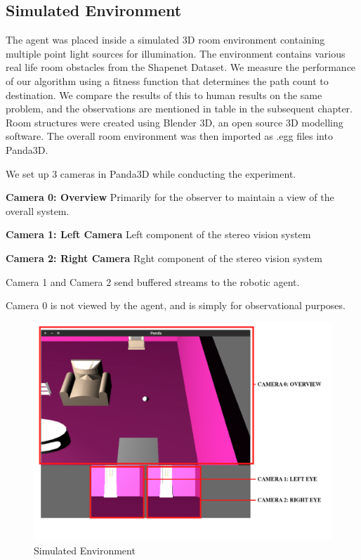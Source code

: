 \subsection{Simulated Environment}
The agent was placed inside a simulated 3D room environment containing multiple point light sources for illumination. The environment contains various real life room obstacles from the Shapenet Dataset.
We measure the performance of our algorithm using a fitness function that determines the path count to destination. We compare the results of this to human results on the same problem, and the observations are mentioned in table in the subsequent chapter.
Room structures were created using Blender 3D, an open source 3D modelling software. The overall room environment was then imported as .egg files into Panda3D.

We set up 3 cameras in Panda3D while conducting the experiment.
 
\textbf{Camera 0: Overview} 
Primarily for the observer to maintain a view of the overall system.

\textbf{Camera 1: Left Camera}
Left component of the stereo vision system

\textbf{Camera 2: Right Camera}
Rght component of the stereo vision system

Camera 1 and Camera 2 send buffered streams to the robotic agent. 

Camera 0 is not viewed by the agent, and is simply for observational purposes.

\begin{figure}
  \includegraphics[width=\linewidth]{images/godview.png}
  \caption{Simulated Environment}
  \label{fig:boat1}
\end{figure}